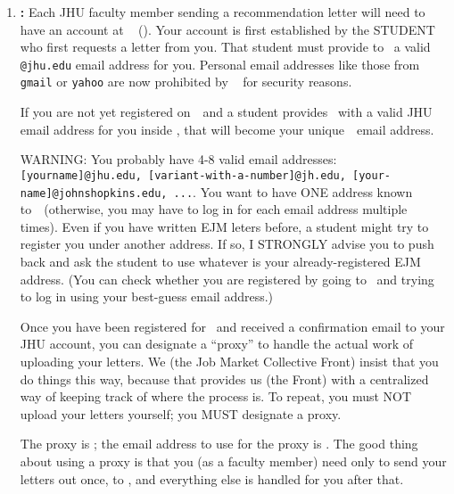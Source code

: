 \documentclass{\econtex}
\begin{document}
\begin{enumerate}
\item \textbf{\EJM:} Each JHU faculty member sending a recommendation letter will need to have an account at \EJM ~ (\EJMLink). Your account is first established by the STUDENT who first requests a letter from you. That student must provide to \EJM~a valid \texttt{@jhu.edu} email address for you.  Personal email addresses like those from \texttt{gmail} or \texttt{yahoo} are now prohibited by \EJM~ for security reasons. 

  \medskip
  If you are not yet registered on~\EJM~and a student provides \EJM~with a valid JHU email address for you inside \EJM, that will become your unique~\EJM~email address.

  WARNING: You probably have 4-8 valid email addresses: \texttt{[yourname]@jhu.edu, [variant-with-a-number]@jh.edu, [your-name]@johnshopkins.edu, ...}.  You want to have ONE address known to~{\EJM}~(otherwise, you may have to log in for each email address multiple times).  Even if you have written EJM leters before, a student might try to register you under another address.  If so, I STRONGLY advise you to push back and ask the student to use whatever is your already-registered EJM address.  (You can check whether you are registered by going to {\EJM}~and trying to log in using your best-guess email address.)

  Once you have been registered for \EJM~and received a confirmation email to your JHU account, you can designate a ``proxy'' to handle the actual work of uploading your letters.  We (the Job Market Collective Front) insist that you do things this way, because that provides us (the Front) with a centralized way of keeping track of where the process is.  To repeat, you must NOT upload your letters yourself; you MUST designate a proxy.

  The proxy is {\JMStaffName} \JMStaffNameLast; the email address to use for the proxy is
  \jmstaffemail.  The good thing about using a proxy is that you (as a faculty member)
  need only to send your letters out once, to \jmstaffemail, and everything 
  else is handled for you after that. %

  \begin{comment}
    \textcolor{red}{
    \item \textbf{\AJO:}
      Each JHU faculty member must register at \AJOLink~ and enter {\JMStaffName} \JMStaffNameLast as their proxy, using the
      \jmstaffemail~ email address. To do this, log in to your account and click on the `proxy' link near the bottom. This only needs to be done once and the proxy works for all applicants the faculty may have on the job market that year.}
  \end{comment}


\end{enumerate}
\end{document}
